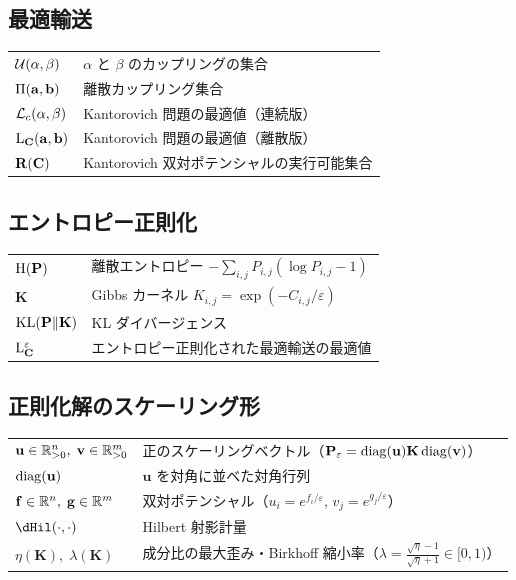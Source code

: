 \documentclass[uplatex, dvipdfmx]{jsreport}
\begin{document}
\subsection*{最適輸送}
\begin{tabular}{ll}
  $\mathcal{U}(\alpha, \beta)$ & $\alpha$ と $\beta$ のカップリングの集合 \\
  $\Pi(\mathbf{a}, \mathbf{b})$ & 離散カップリング集合 \\
  $\mathcal{L}_c(\alpha, \beta)$ & Kantorovich 問題の最適値（連続版） \\
  $\mathrm{L}_{\mathbf{C}}(\mathbf{a}, \mathbf{b})$ & Kantorovich 問題の最適値（離散版） \\
  $\mathbf{R}(\mathbf{C})$ & Kantorovich 双対ポテンシャルの実行可能集合 \\
\end{tabular}

\subsection*{エントロピー正則化}
\begin{tabular}{ll}
  $\mathrm{H}(\mathbf{P})$ & 離散エントロピー $-\sum_{i,j} P_{i,j}(\log P_{i,j} - 1)$ \\
  $\mathbf{K}$ & Gibbs カーネル $K_{i,j} = \exp(-C_{i,j}/\varepsilon)$ \\
  $\mathrm{KL}(\mathbf{P} \| \mathbf{K})$ & KL ダイバージェンス \\
  $\mathrm{L}_{\mathbf{C}}^\varepsilon$ & エントロピー正則化された最適輸送の最適値 \\
\end{tabular}

\subsection*{正則化解のスケーリング形}
\begin{tabular}{ll}
  $\mathbf{u} \in \mathbb{R}_{>0}^n,\; \mathbf{v} \in \mathbb{R}_{>0}^m$
    & 正のスケーリングベクトル（$\mathbf{P}_\varepsilon = \operatorname{diag}(\mathbf{u})\mathbf{K}\operatorname{diag}(\mathbf{v})$） \\
  $\operatorname{diag}(\mathbf{u})$ & $\mathbf{u}$ を対角に並べた対角行列 \\
  $\mathbf{f} \in \mathbb{R}^n,\; \mathbf{g} \in \mathbb{R}^m$
    & 双対ポテンシャル（$u_i = e^{f_i/\varepsilon}$, $v_j = e^{g_j/\varepsilon}$） \\
  $\dHil(\cdot,\cdot)$ & Hilbert 射影計量 \\
  $\eta(\mathbf{K}),\; \lambda(\mathbf{K})$
    & 成分比の最大歪み・Birkhoff 縮小率（$\lambda = \tfrac{\sqrt{\eta}-1}{\sqrt{\eta}+1} \in [0,1)$） \\
\end{tabular}
\end{document}
